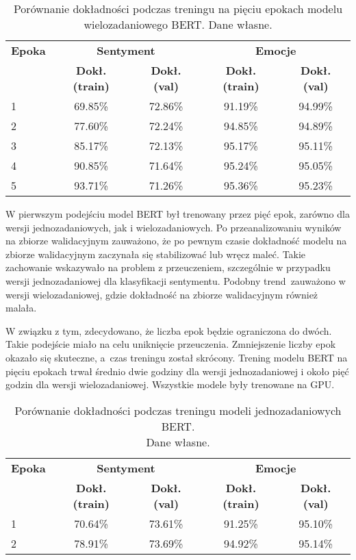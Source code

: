 \begin{table}[H]
\centering
\label{tab:bert_multi_5_training_process}
\begin{tabular}{|l|c|c|c|c|}
\hline
\textbf{Epoka} & \multicolumn{2}{c|}{\textbf{Sentyment}} & \multicolumn{2}{c|}{\textbf{Emocje}} \\
\cline{2-5}
& \textbf{Dokł. (train)} & \textbf{Dokł. (val)} & \textbf{Dokł. (train)} & \textbf{Dokł. (val)} \\
\hline
1 & 69.85\% & 72.86\% & 91.19\% & 94.99\% \\
2 & 77.60\% & 72.24\% & 94.85\% & 94.89\% \\
3 & 85.17\% & 72.13\% & 95.17\% & 95.11\% \\
4 & 90.85\% & 71.64\% & 95.24\% & 95.05\% \\
5 & 93.71\% & 71.26\% & 95.36\% & 95.23\% \\
\hline
\end{tabular}
\caption{Porównanie dokładności podczas treningu na pięciu epokach modelu wielozadaniowego BERT. Dane własne.}
\end{table}

W pierwszym podejściu model BERT był trenowany przez pięć epok, zarówno dla wersji jednozadaniowych, jak i wielozadaniowych. Po przeanalizowaniu wyników na zbiorze walidacyjnym zauważono, że po pewnym czasie dokładność modelu na zbiorze walidacyjnym zaczynała się stabilizować lub wręcz maleć. Takie zachowanie wskazywało na problem z przeuczeniem, szczególnie w przypadku wersji jednozadaniowej dla klasyfikacji sentymentu. Podobny trend~zauważono w wersji wielozadaniowej, gdzie dokładność na zbiorze walidacyjnym również malała.

W związku z tym, zdecydowano, że liczba epok będzie ograniczona do dwóch. Takie podejście miało na celu uniknięcie przeuczenia. Zmniejszenie liczby epok okazało się skuteczne, a~czas treningu został skrócony. Trening modelu BERT na pięciu epokach trwał średnio dwie godziny dla wersji jednozadaniowej i około pięć godzin dla wersji wielozadaniowej. Wszystkie modele były trenowane na GPU.

\begin{table}[H]
\centering
\label{tab:bert_2_training_process}
\begin{tabular}{|l|c|c|c|c|}
\hline
\textbf{Epoka} & \multicolumn{2}{c|}{\textbf{Sentyment}} & \multicolumn{2}{c|}{\textbf{Emocje}} \\
\cline{2-5}
& \textbf{Dokł. (train)} & \textbf{Dokł. (val)} & \textbf{Dokł. (train)} & \textbf{Dokł. (val)} \\
\hline
1 & 70.64\% & 73.61\% & 91.25\% & 95.10\% \\
2 & 78.91\% & 73.69\% & 94.92\% & 95.14\% \\
\hline
\end{tabular}
\caption{Porównanie dokładności podczas treningu modeli jednozadaniowych BERT.\\Dane własne.}
\end{table}

